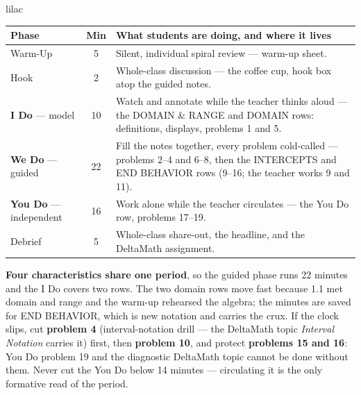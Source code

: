 \documentclass[10pt]{article}
\begin{document}
\boxguard[22]
\begin{skillbox}{lilac}
\small
\renewcommand{\arraystretch}{1.25}
\begin{tabularx}{\linewidth}{@{} l c X @{}}
\textbf{Phase} & \textbf{Min} & \textbf{What students are doing, and where it lives} \\
\midrule
Warm-Up                       & 5  & Silent, individual spiral review --- warm-up sheet. \\
Hook                          & 2  & Whole-class discussion --- the coffee cup, hook box atop the guided notes. \\
\textbf{I Do} --- model       & 10 & Watch and annotate while the teacher thinks aloud --- the DOMAIN \& RANGE and DOMAIN rows: definitions, displays, problems 1 and 5. \\
\textbf{We Do} --- guided     & 22 & Fill the notes together, every problem cold-called --- problems 2--4 and 6--8, then the INTERCEPTS and END BEHAVIOR rows (9--16; the teacher works 9 and 11). \\
\textbf{You Do} --- independent & 16 & Work alone while the teacher circulates --- the You Do row, problems 17--19. \\
Debrief                       & 5  & Whole-class share-out, the headline, and the DeltaMath assignment. \\
\end{tabularx}

\smallskip
\textbf{Four characteristics share one period}, so the guided phase runs 22 minutes and the
I Do covers two rows. The two domain rows move fast because 1.1 met domain and range and the
warm-up rehearsed the algebra; the minutes are saved for END BEHAVIOR, which is new notation and
carries the crux. If the clock slips, cut \textbf{problem 4} (interval-notation drill --- the
DeltaMath topic \textit{Interval Notation} carries it) first, then \textbf{problem 10}, and
protect \textbf{problems 15 and 16}: You Do problem 19 and the diagnostic DeltaMath topic cannot
be done without them. Never cut the You Do below 14 minutes --- circulating it is the only
formative read of the period.
\end{skillbox}
\end{document}
